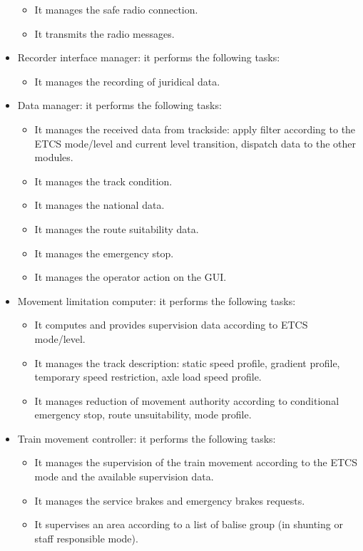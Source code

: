 \documentclass[nocc]{template/openetcs_report}
\begin{document}
\begin{itemize}
\begin{itemize}
	\item	It manages the safe radio connection.
	\item	It transmits the radio messages.
	\end{itemize}
\item	Recorder interface manager: it performs the following tasks:
	\begin{itemize}
	\item	It manages the recording of juridical data.
	\end{itemize}
\item	Data manager: it performs the following tasks:
	\begin{itemize}
	\item	It manages the received data from trackside: apply filter according to the ETCS mode/level and current level transition, dispatch data to the other modules.
	\item	It manages the track condition.
	\item	It manages the national data.
	\item	It manages the route suitability data.
	\item	It manages the emergency stop.
	\item	It manages the operator action on the GUI.
	\end{itemize}
\item	Movement limitation computer: it performs the following tasks:
	\begin{itemize}
	\item	It computes and provides supervision data according to ETCS mode/level.
	\item	It manages the track description: static speed profile, gradient profile, temporary speed restriction, axle load speed profile.
	\item	It manages reduction of movement authority according to conditional emergency stop, route unsuitability, mode profile.
	\end{itemize}
\item	Train movement controller: it performs the following tasks:
	\begin{itemize}
	\item	It manages the supervision of the train movement according to the ETCS mode and the available supervision data.
	\item	It manages the service brakes and emergency brakes requests.
	\item	It supervises an area according to a list of balise group (in shunting or staff responsible mode).

\end{itemize}
\end{itemize}
\end{document}
